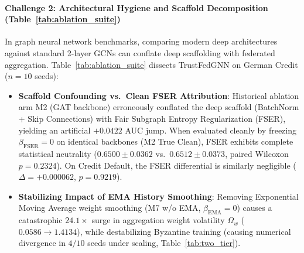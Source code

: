 \paragraph{Challenge 2: Architectural Hygiene and Scaffold Decomposition (Table~\ref{tab:ablation_suite})}
In graph neural network benchmarks, comparing modern deep architectures against standard 2-layer GCNs can conflate deep scaffolding with federated aggregation. Table~\ref{tab:ablation_suite} dissects TrustFedGNN on German Credit ($n=10$ seeds):
\begin{itemize}[leftmargin=*]
    \item \textbf{Scaffold Confounding vs.\ Clean FSER Attribution}: Historical ablation arm M2 (GAT backbone) erroneously conflated the deep scaffold (BatchNorm + Skip Connections) with Fair Subgraph Entropy Regularization (FSER), yielding an artificial $+0.0422$ AUC jump. When evaluated cleanly by freezing $\beta_{\text{FSER}} = 0$ on identical backbones (M2 True Clean), FSER exhibits complete statistical neutrality ($0.6500 \pm 0.0362$ vs.\ $0.6512 \pm 0.0373$, paired Wilcoxon $p = 0.2324$). On Credit Default, the FSER differential is similarly negligible ($\Delta = +0.000062$, $p = 0.9219$).
    \item \textbf{Stabilizing Impact of EMA History Smoothing}: Removing Exponential Moving Average weight smoothing (M7 w/o EMA, $\beta_{\text{EMA}} = 0$) causes a catastrophic $24.1\times$ surge in aggregation weight volatility $\Omega_w$ ($0.0586 \to 1.4134$), while destabilizing Byzantine training (causing numerical divergence in $4/10$ seeds under scaling, Table~\ref{tab:two_tier}).
\end{itemize}




